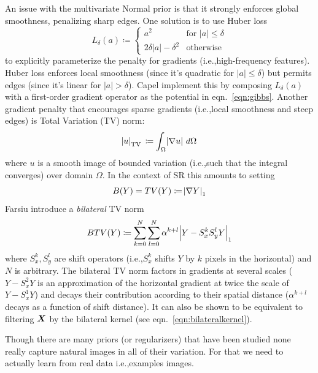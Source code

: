 An issue with the multivariate Normal prior is that it strongly enforces global smoothness, penalizing sharp edges.
%
One solution is to use Huber loss\cite{huber1964}
\begin{equation}
    L_{\delta }(a)\coloneqq {
    \begin{cases}
        a^2 & \text{for }\lvert a \rvert \leq \delta \\
        2 \delta \lvert a \rvert - \delta^2 & {\text{otherwise}}
    \end{cases}
    }
\end{equation}
to explicitly parameterize the penalty for gradients (i.e.,high-frequency features).
%
Huber loss enforces local smoothness (since it's quadratic for \(\lvert a \rvert \leq \delta\)) but permits edges (since it's linear for \(\lvert a \rvert > \delta\)).
%
Capel \etal\cite{capel2000} implement this by composing \(L_{\delta }(a)\) with a first-order gradient operator as the potential in eqn.~\eqref{eqn:gibbs}.
%
Another gradient penalty that encourages sparse gradients (i.e.,local smoothness and steep edges) is Total Variation (TV) norm\cite{RUDIN1992259}:
\begin{equation}
    \abs{u}_{\operatorname {TV}}\,\coloneqq\int _{\Omega }\abs{\nabla u}\,d\Omega
\end{equation}
where \(u\) is a smooth image of bounded variation (i.e.,such that the integral converges) over domain \(\Omega\).
%
In the context of SR this amounts to setting
\begin{equation}
    B(Y) = TV(Y) \coloneqq \abs{ \nabla Y }_1
\end{equation}
%
Farsiu \etal\cite{farsiu} introduce a \textit{bilateral} TV norm
\begin{equation}
    BTV(Y) \coloneqq \sum_{k=0}^{N} \sum_{l=0}^{N} \alpha^{k + l} \abs{ Y - S_x^k S_y^l Y }_1
\end{equation}
where \(S_x^k, S_y^l\) are shift operators (i.e.,\(S_x^k\) shifts \(Y\) by \(k\) pixels in the horizontal) and \(N\) is arbitrary.
%
The bilateral TV norm factors in gradients at several scales (\(Y - S_x^2 Y\) is an approximation of the horizontal gradient at twice the scale of \(Y - S_x^1 Y\)) and decays their contribution according to their spatial distance (\(\alpha^{k+l}\) decays as a function of shift distance).
%
It can also be shown to be equivalent\cite{elad2002} to filtering \(\bm{X}\) by the bilateral kernel (see eqn.~\eqref{eqn:bilateralkernel}).

Though there are many priors (or regularizers) that have been studied none really capture natural images in all of their variation.
%
For that we need to actually learn from real data i.e.,examples images.

